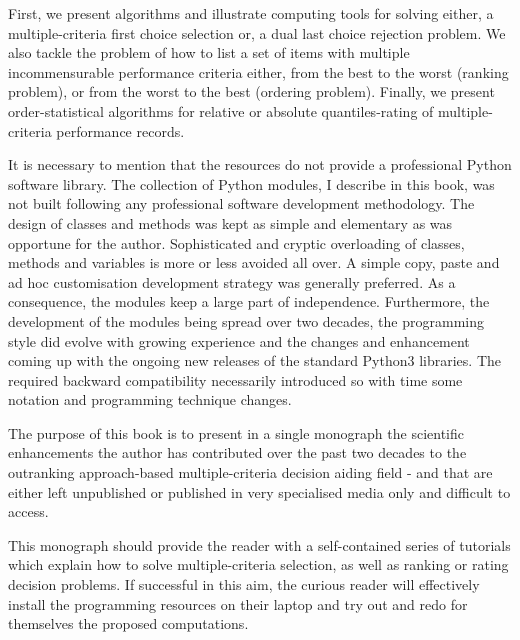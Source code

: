 First, we present algorithms and illustrate computing tools for solving either, a multiple-criteria first choice selection or, a dual last choice rejection problem. We also tackle the problem of how to list a set of items with multiple incommensurable performance criteria either, from the best to the worst (ranking problem), or from the worst to the best (ordering problem). Finally, we present order-statistical algorithms for relative or absolute quantiles-rating of multiple-criteria performance records.

It is necessary to mention that the \Digraph resources do not provide a professional Python software library. The collection of Python modules, I describe in this book, was not built following any professional software development methodology. The design of classes and methods was kept as simple and elementary as was opportune for the author. Sophisticated and cryptic overloading of classes, methods and variables is more or less avoided all over. A simple copy, paste and ad hoc customisation development strategy was generally preferred. As a consequence, the \Digraph modules keep a large part of independence.  Furthermore, the development of the \Digraph modules being spread over two decades, the programming style did evolve with growing experience and the changes and enhancement coming up with the ongoing new releases of the standard Python3 libraries. The required backward compatibility necessarily introduced so with time some notation and programming technique changes.


The purpose of this book is to present in a single monograph the scientific enhancements the author has contributed over the past two decades to the outranking approach-based multiple-criteria decision aiding field - and that are either left unpublished or published in very specialised media only and difficult to access.  


This monograph should provide the reader with a self-contained series of tutorials which explain how to solve multiple-criteria selection, as well as ranking or rating decision problems. If successful in this aim, the curious reader will effectively install the \Digraph programming resources on their laptop and try out and redo for themselves the proposed computations.

